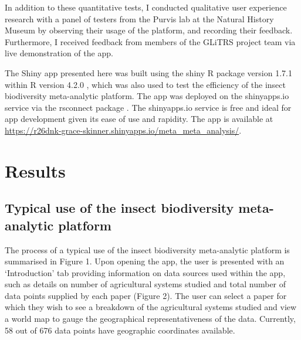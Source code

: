 \documentclass[11pt]{article}
\begin{document}
		\noindent In addition to these quantitative tests, I conducted qualitative user experience research with a panel of testers from the Purvis lab at the Natural History Museum by observing their usage of the platform, and recording their feedback. Furthermore, I received feedback from members of the GLiTRS project team via live demonstration of the app.
		
		\noindent The Shiny app presented here was built using the shiny R package version 1.7.1 \citep{chang2022shiny} within R version 4.2.0 \citep{team2013r}, which was also used to test the efficiency of the insect biodiversity meta-analytic platform. The app was deployed on the shinyapps.io service via the rsconnect package \citep{atkins2019rsconnect}. The shinyapps.io service is free and ideal for app development given its ease of use and rapidity. The app is available at \url{https://r26dnk-grace-skinner.shinyapps.io/meta_meta_analysis/}. 
		
		\clearpage 
		
		\section{Results}
		\subsection{Typical use of the insect biodiversity meta-analytic platform} 
		The process of a typical use of the insect biodiversity meta-analytic platform is summarised in Figure 1. Upon opening the app, the user is presented with an ‘Introduction’ tab providing information on data sources used within the app, such as details on number of agricultural systems studied and total number of data points supplied by each paper (Figure 2). The user can select a paper for which they wish to see a breakdown of the agricultural systems studied and view a world map to gauge the geographical representativeness of the data. Currently, 58 out of 676 data points have geographic coordinates available.
		
\end{document}

